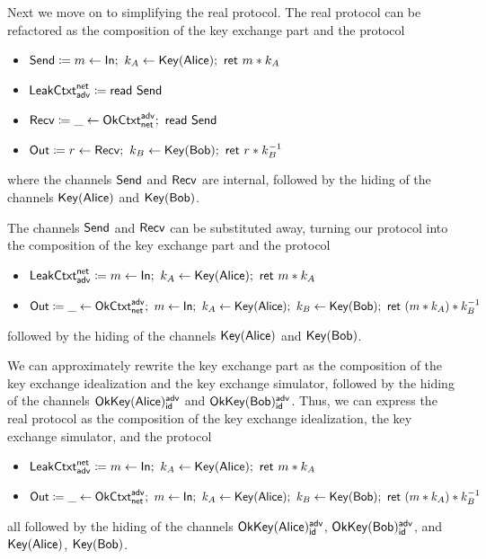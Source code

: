Next we move on to simplifying the real protocol. The real protocol can be refactored as the composition of the key exchange part and the protocol
\begin{itemize}
\item $\Send \coloneqq m \leftarrow \In; \ k_A \leftarrow \Key(\Alice); \ \ret{m * k_A}$
\item $\mathsf{LeakCtxt}^{\mathsf{net}}_{\mathsf{adv}} \coloneqq \mathsf{read} \ \mathsf{Send}$
\item $\mathsf{Recv} \coloneqq \_ \leftarrow \mathsf{OkCtxt}^{\mathsf{adv}}_{\mathsf{net}}; \ \mathsf{read} \ \mathsf{Send}$
\item $\Out \coloneqq r \leftarrow \Recv; \ k_B \leftarrow \Key(\Bob); \ \ret{r * k_B^{-1}}$
\end{itemize}
where the channels $\mathsf{Send}$ and $\mathsf{Recv}$ are internal, followed by the hiding of the channels $\mathsf{Key}(\mathsf{Alice})$ and $\mathsf{Key}(\mathsf{Bob})$.

The channels $\mathsf{Send}$ and $\mathsf{Recv}$ can be substituted away, turning our protocol into the composition of the key exchange part and the protocol
\begin{itemize}
\item $\mathsf{LeakCtxt}^{\mathsf{net}}_{\mathsf{adv}} \coloneqq m \leftarrow \mathsf{In}; \ k_A \leftarrow \mathsf{Key}(\mathsf{Alice}); \ \mathsf{ret} \ m * k_A$
\item $\Out \coloneqq \_ \leftarrow \OkCtxt^\adv_\net; \ m \leftarrow \In; \ k_A \leftarrow \Key(\Alice); \ k_B \leftarrow \Key(\Bob); \ \ret{(m * k_A) * k_B^{-1}}$
\end{itemize}
followed by the hiding of the channels $\mathsf{Key}(\mathsf{Alice})$ and $\mathsf{Key}(\mathsf{Bob})$.

We can approximately rewrite the key exchange part as the composition of the key exchange idealization and the key exchange simulator, followed by the hiding of the channels $\mathsf{OkKey}(\mathsf{Alice})^{\mathsf{adv}}_{\mathsf{id}}$ and $\mathsf{OkKey}(\mathsf{Bob})^{\mathsf{adv}}_{\mathsf{id}}$. Thus, we can express the real protocol as the composition of the key exchange idealization, the key exchange simulator, and the protocol
\begin{itemize}
\item $\mathsf{LeakCtxt}^{\mathsf{net}}_{\mathsf{adv}} \coloneqq m \leftarrow \mathsf{In}; \ k_A \leftarrow \mathsf{Key}(\mathsf{Alice}); \ \mathsf{ret} \ m * k_A$
\item $\Out \coloneqq \_ \leftarrow \OkCtxt^\adv_\net; \ m \leftarrow \In; \ k_A \leftarrow \Key(\Alice); \ k_B \leftarrow \Key(\Bob); \ \ret{(m * k_A) * k_B^{-1}}$
\end{itemize}
all followed by the hiding of the channels $\mathsf{OkKey}(\mathsf{Alice})^{\mathsf{adv}}_{\mathsf{id}}$, $\mathsf{OkKey}(\mathsf{Bob})^{\mathsf{adv}}_{\mathsf{id}}$, and $\mathsf{Key}(\mathsf{Alice})$, $\mathsf{Key}(\mathsf{Bob})$.

